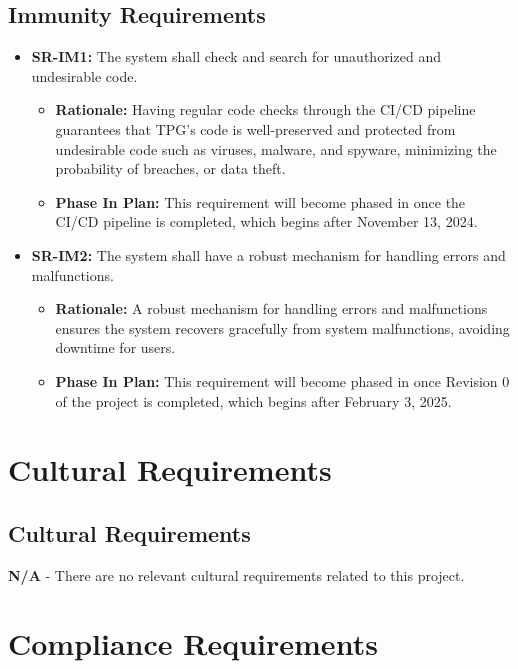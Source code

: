 \documentclass[12pt]{article}
\begin{document}
\subsection{Immunity Requirements}
\begin{itemize}
  \item \label{SR-IM1} \textbf{SR-IM1:} The system shall check and search for unauthorized and undesirable code.
  \begin{itemize}
    \item \textbf{Rationale:} Having regular code checks through the CI/CD pipeline guarantees that TPG's code is well-preserved and protected from undesirable code such as viruses, malware, and spyware, minimizing the probability of breaches, or data theft.
    \item \textbf{Phase In Plan:} This requirement will become phased in once the CI/CD pipeline is completed, which begins after November 13, 2024.
  \end{itemize}
  \item \label{SR-IM2} \textbf{SR-IM2:} The system shall have a robust mechanism for handling errors and malfunctions.
  \begin{itemize}
    \item \textbf{Rationale:} A robust mechanism for handling errors and malfunctions ensures the system recovers gracefully from system malfunctions, avoiding downtime for users.
    \item \textbf{Phase In Plan:} This requirement will become phased in once Revision 0 of the project is completed, which begins after February 3, 2025. 
  \end{itemize}
\end{itemize}

\section{Cultural Requirements}




\subsection{Cultural Requirements}
\textbf{N/A} - There are no relevant cultural requirements related to this project.

\section{Compliance Requirements}
\end{document}
